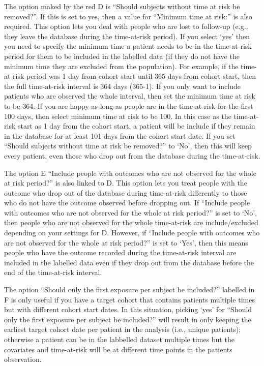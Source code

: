 \documentclass[11pt]{book}
\theoremstyle{definition}
\theoremstyle{definition}
\theoremstyle{definition}
\theoremstyle{remark}
\begin{document}
The option maked by the red D is ``Should subjects without time at risk be removed?''. If this is set to yes, then a value for ``Minimum time at risk:'' is also required. This option lets you deal with people who are lost to follow-up (e.g., they leave the database during the time-at-risk period). If you select `yes' then you need to specify the minimum time a patient needs to be in the time-at-risk period for them to be included in the labelled data (if they do not have the minimum time they are excluded from the population). For example, if the time-at-risk period was 1 day from cohort start until 365 days from cohort start, then the full time-at-risk interval is 364 days (365-1). If you only want to include patients who are observed the whole interval, then set the minimum time at risk to be 364. If you are happy as long as people are in the time-at-risk for the first 100 days, then select minimum time at risk to be 100. In this case as the time-at-risk start as 1 day from the cohort start, a patient will be include if they remain in the database for at least 101 days from the cohort start date. If you set ``Should subjects without time at risk be removed?'' to `No', then this will keep every patient, even those who drop out from the database during the time-at-risk.

The option E ``Include people with outcomes who are not observed for the whole at risk period?'' is also linked to D. This option lets you treat people with the outcome who drop out of the database during time-at-risk differently to those who do not have the outcome observed before dropping out. If ``Include people with outcomes who are not observed for the whole at risk period?'' is set to `No', then people who are not observed for the whole time-at-risk are include/excluded depending on your settings for D. However, if ``Include people with outcomes who are not observed for the whole at risk period?'' is set to `Yes', then this means people who have the outcome recorded during the time-at-risk interval are included in the labelled data even if they drop out from the database before the end of the time-at-risk interval.

The option ``Should only the first exposure per subject be included?'' labelled in F is only useful if you have a target cohort that contains patients multiple times but with different cohort start dates. In this situation, picking `yes' for ``Should only the first exposure per subject be included?'' will result in only keeping the earliest target cohort date per patient in the analysis (i.e., unique patients); otherwise a patient can be in the labbelled dataset multiple times but the covariates and time-at-risk will be at different time points in the patients observation.
\end{document}
